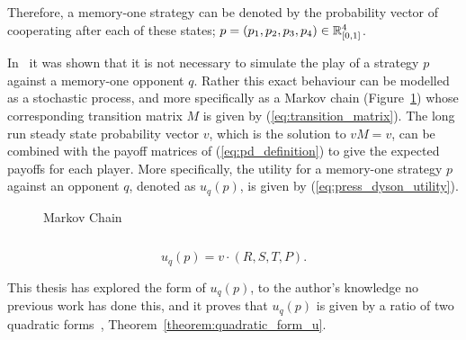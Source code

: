 Therefore, a memory-one strategy can be denoted by the probability vector of
cooperating after each of these states; \(p=(p_1, p_2, p_3, p_4) \in \mathbb{R}_{[0,1]}
^ 4\).

In~\cite{Nowak1989} it was shown that it is not necessary to simulate the play
of a strategy $p$ against a memory-one opponent $q$. Rather this exact behaviour
can be modelled as a stochastic process, and more specifically as a Markov chain
(Figure~\ref{fig:markov_chain}) whose corresponding transition matrix \(M\) is
given by (\ref{eq:transition_matrix}). The long run steady state probability
vector \(v\), which is the solution to \(v M = v\), can be
combined with the payoff matrices of (\ref{eq:pd_definition}) to give the expected
payoffs for each player. More specifically, the utility for a memory-one
strategy \(p\) against an opponent \(q\), denoted as \(u_q(p)\), is given by
(\ref{eq:press_dyson_utility}).

\begin{figure}
    \centering
    
    \caption{Markov Chain}
    \label{fig:markov_chain}
\end{figure}

\begin{equation}\label{eq:transition_matrix}
    
\end{equation}


\begin{equation}\label{eq:press_dyson_utility}
    u_q(p) = v \cdot (R, S, T, P).
\end{equation}

This thesis has explored the form of \(u_q(p)\), to the author's knowledge no
previous work has done this, and it proves that \(u_q(p)\) is given by a ratio
of two quadratic forms~\cite{kepner2011}, Theorem~\ref{theorem:quadratic_form_u}.


